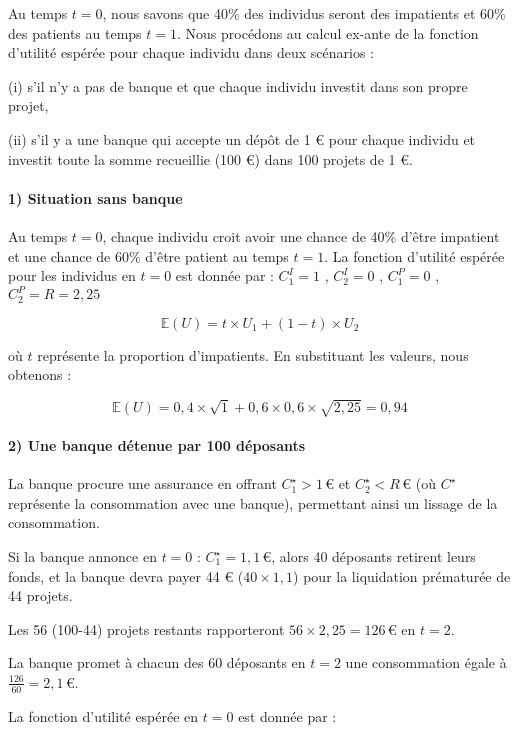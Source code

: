 \documentclass[a4paper, 12pt]{report}
\begin{document}
Au temps \( t=0 \), nous savons que 40\% des individus seront des impatients et 60\% des patients au temps \( t=1 \). Nous procédons au calcul ex-ante de la fonction d'utilité espérée pour chaque individu dans deux scénarios : 

(i) s'il n'y a pas de banque et que chaque individu investit dans son propre projet, 

(ii) s'il y a une banque qui accepte un dépôt de 1 € pour chaque individu et investit toute la somme recueillie (100 €) dans 100 projets de 1 €.

\paragraph{1) Situation sans banque}

Au temps \( t=0 \), chaque individu croit avoir une chance de 40\% d'être impatient et une chance de 60\% d'être patient au temps \( t=1 \). La fonction d'utilité espérée pour les individus en \( t=0 \) est donnée par : \( C_1^I= 1 \) , \( C_2^I= 0 \) , \( C_1^P= 0 \) , \( C_2^P= R = 2,25 \)

\[
\mathbb{E}(U) = t \times U_1 + (1-t) \times U_2
\]

où \( t \) représente la proportion d'impatients. En substituant les valeurs, nous obtenons :

\[
\mathbb{E}(U) = 0,4 \times \sqrt{1} + 0,6 \times 0,6 \times \sqrt{2,25} = 0,94
\]

\paragraph{2) Une banque détenue par 100 déposants}

La banque procure une assurance en offrant \( C_1^{\star} > 1 \, \text{€} \) et \( C_2^{\star} < R \, \text{€} \) (où \( C^{\star} \) représente la consommation avec une banque), permettant ainsi un lissage de la consommation. 

Si la banque annonce en \( t=0 \) : \( C_1^{\star}= 1,1 \, \text{€} \), alors 40 déposants retirent leurs fonds, et la banque devra payer 44 € (\( 40 \times 1,1 \)) pour la liquidation prématurée de 44 projets.

Les 56 (100-44) projets restants rapporteront \( 56 \times 2,25 = 126 \, \text{€} \) en \( t=2 \).


La banque promet à chacun des 60 déposants en \( t=2 \) une consommation égale à \( \frac{126}{60} = 2,1 \, \text{€} \).

La fonction d’utilité espérée en \( t=0 \) est donnée par :
\end{document}
